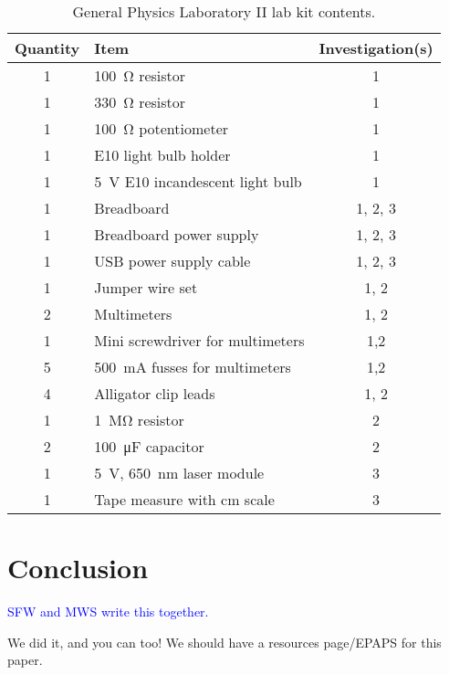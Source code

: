 \documentclass[aip, numerical, preprint]{revtex4-2}
\begin{document}
 \begin{table}
    \caption{\label{tab: 1261 lab kit} General Physics Laboratory II lab kit contents.}
        \begin{tabular}{clc}
            \hline\hline
            Quantity & Item & Investigation(s)\\
            \hline
            1 & \SI{100}{\ohm} resistor & 1 \\
            1 & \SI{330}{\ohm} resistor & 1 \\
            1 &  \SI{100}{\ohm} potentiometer & 1 \\
            1 & E10 light bulb holder & 1 \\
            1 & \SI{5}{V} E10 incandescent light bulb & 1 \\
            1 & Breadboard & 1, 2, 3 \\
            1 & Breadboard power supply & 1, 2, 3 \\
            1 & USB power supply cable & 1, 2, 3 \\
            1 & Jumper wire set & 1, 2 \\
            2 & Multimeters & 1, 2 \\
            1 & Mini screwdriver for multimeters & 1,2 \\
            5 & \SI{500}{mA} fusses for multimeters & 1,2 \\
            4 & Alligator clip leads & 1, 2 \\
            1 & \SI{1}{\mega\ohm} resistor & 2 \\
            2 & \SI{100}{\micro\farad} capacitor & 2 \\
            1 & \SI{5}{V}, \SI{650}{nm} laser module & 3 \\
            1 & Tape measure with cm scale & 3 \\            
            \hline\hline
        \end{tabular}
\end{table}


\section{Conclusion}
\textcolor{blue}{SFW and MWS write this together.}

We did it, and you can too!  We should have a resources page/EPAPS for this paper.


\end{document}
